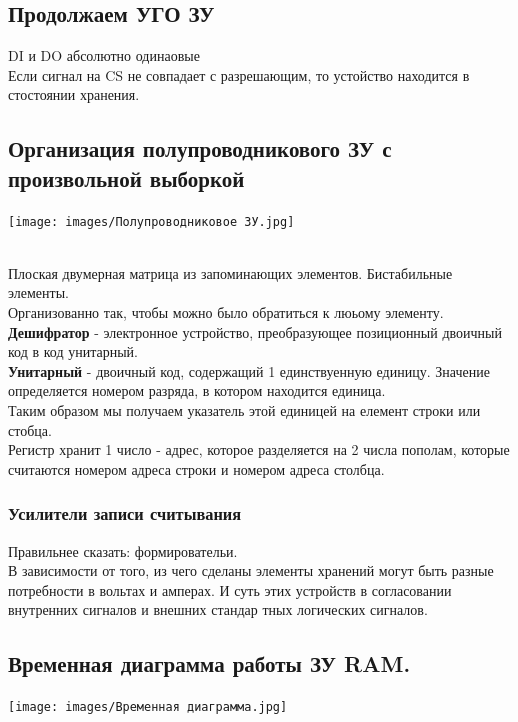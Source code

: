 \documentclass[12px]{article}
\begin{document}
\subsection{Продолжаем УГО ЗУ}
DI и DO абсолютно одинаовые\\
Если сигнал на CS не совпадает с разрешающим, то устойство находится в стостоянии хранения. 
\subsection{Организация полупроводникового ЗУ с произвольной выборкой}
\begin{cenetr}
	\texttt{[image: images/Полупроводниковое ЗУ.jpg]}
\end{cenetr}
\\
Плоская двумерная матрица из запоминающих элементов. 
Бистабильные элементы. \\
Организованно так, чтобы можно было обратиться к люьому элементу. \\
\textbf{Дешифратор} - электронное устройство, преобразующее позиционный двоичный код в код унитарный. \\
\textbf{Унитарный} - двоичный код, содержащий 1 единствуенную единицу. Значение определяется номером разряда, в котором находится единица.\\
Таким образом мы получаем указатель этой единицей на елемент строки или стобца.\\
Регистр хранит 1 число - адрес, которое разделяется на 2 числа пополам, которые считаются номером адреса строки и номером адреса столбца.\\

\subsubsection{Усилители записи считывания}
Правильнее сказать: формировательи.\\
В зависимости от того, из чего сделаны элементы хранений могут быть разные потребности в вольтах и амперах. И суть этих устройств в согласовании внутренних сигналов и внешних стандар	тных логических сигналов. \\

\subsection{Временная диаграмма работы ЗУ RAM.}
\begin{center}
	\texttt{[image: images/Временная диаграмма.jpg]}
\end{center}
\end{document}
